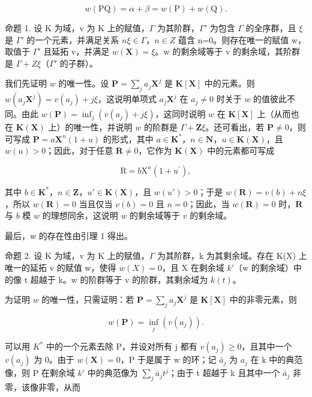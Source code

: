 \[
w (\mathrm{PQ}) = \alpha + \beta = w (\mathrm{P}) + w (\mathrm{Q}).
\]

命题 1. 设 K 为域，v 为 K 上的赋值，\(\Gamma\) 为其阶群，\(\Gamma'\) 为包含 \(\Gamma\) 的全序群，且 \(\xi\) 是 \(\Gamma'\) 的一个元素，并满足关系 \(n\xi\in\Gamma\)，\(n\in Z\) 蕴含 n=0。则存在唯一的赋值 w，取值于 \(\Gamma'\) 且延拓 v，并满足 \(w(\mathbf{X})=\xi\)。w 的剩余域等于 v 的剩余域，其阶群是 \(\Gamma+Z\xi\)（\(\Gamma'\) 的子群）。

我们先证明 \(w\) 的唯一性。设 \(\mathbf{P} = \sum_{j} a_j \mathbf{X}^j\) 是 \(\mathbf{K}[\mathbf{X}]\) 中的元素。则 \(w(a_j \mathbf{X}^j) = v(a_j) + j\xi\)，这说明单项式 \(a_j \mathbf{X}^j\) 在 \(a_j \neq 0\) 时关于 \(w\) 的值彼此不同。由此 \(w(\mathbf{P}) = \inf_j (v(a_j) + j\xi)\)，这同时说明 \(w\) 在 \(\mathbf{K}[\mathbf{X}]\) 上（从而也在 \(\mathbf{K}(\mathbf{X})\) 上）的唯一性，并说明 \(w\) 的阶群是 \(\Gamma + \mathbf{Z}\xi\)。还可看出，若 \(\mathbf{P} \neq 0\)，则可写成 \(\mathbf{P} = a\mathbf{X}^n (1 + u)\) 的形式，其中 \(a\in \mathbf{K}^*\)，\(n\in \mathbf{N}\)，\(u\in \mathbf{K}(\mathbf{X})\)，且 \(w(u) > 0\)；因此，对于任意 \(\mathbf{R}\neq 0\)，它作为 \(\mathbf{K}(\mathbf{X})\) 中的元素都可写成

\[
\mathrm{R} = b \mathrm{X} ^ {n} (1 + u ^ {\prime}),
\]

其中 \(b \in \mathbf{K}^*\)，\(n \in \mathbf{Z}\)，\(u' \in \mathbf{K}(\mathbf{X})\)，且 \(w(u') > 0\)；于是 \(w(\mathbf{R}) = v(b) + n\xi\)，所以 \(w(\mathbf{R}) = 0\) 当且仅当 \(v(b) = 0\) 且 \(n = 0\)；因此，当 \(w(\mathbf{R}) = 0\) 时，\(\mathbf{R}\) 与 \(b\) 模 \(w\) 的理想同余，这说明 \(w\) 的剩余域等于 \(v\) 的剩余域。

最后，w 的存在性由引理 1 得出。

命题 2. 设 K 为域，v 为 K 上的赋值，\(\Gamma\) 为其阶群，k 为其剩余域。存在 K(X) 上唯一的延拓 v 的赋值 w，使得 \(w(X) = 0\)，且 X 在剩余域 \(k'\)（w 的剩余域）中的像 t 超越于 k。w 的阶群等于 v 的阶群，其剩余域为 \(k(t)\)。

为证明 \(w\) 的唯一性，只需证明：若 \(\mathbf{P} = \sum_{j} a_j \mathbf{X}^j\) 是 \(\mathbf{K}[\mathbf{X}]\) 中的非零元素，则

\[
w (\mathbf {P}) = \inf _ {j} (v (a _ {j})).
\]

可以用 \(K^{*}\) 中的一个元素去除 P，并设对所有 j 都有 \(v(a_{j}) \geqslant 0\)，且其中一个 \(v(a_{j})\) 为 0。由于 \(w(\mathbf{X}) = 0\)，P 于是属于 w 的环；记 \(\bar{a}_{j}\) 为 \(a_{j}\) 在 k 中的典范像，则 P 在剩余域 \(k'\) 中的典范像为 \(\sum_{j} \bar{a}_{j} t^{j}\)；由于 t 超越于 k 且其中一个 \(\bar{a}_{j}\) 非零，该像非零，从而

